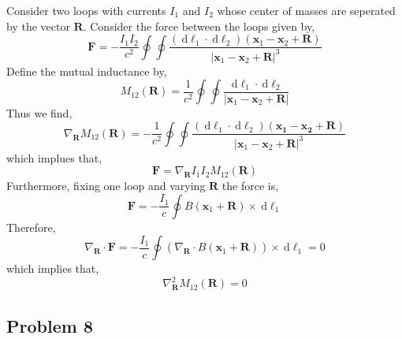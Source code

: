 \documentclass[12pt]{extarticle}
\renewcommand{\d}[1]{\: \mathrm{d}#1}
\renewcommand{\bf}[1]{\mathbf{#1}}
\theoremstyle{definition}
\begin{document}
Consider two loops with currents $I_1$ and $I_2$ whose center of masses are seperated by the vector $\bf{R}$. Consider the force between the loops given by,
\[ \bf{F} = - \frac{I_1 I_2}{c^2} \oint \oint \frac{(\d{\ell_1} \cdot \d{\ell_2}) (\bf{x}_1 - \bf{x}_2 + \bf{R})}{| \bf{x}_1 - \bf{x}_2 + \bf{R} |^3} \]
Define the mutual inductance by,
\[ M_{12}(\bf{R}) = \frac{1}{c^2} \oint \oint \frac{\d{\ell_1} \cdot \d{\ell_2}}{| \bf{x}_1 - \bf{x}_2 + \bf{R} |} \]
Thus we find,
\[ \nabla_{\bf{R}} M_{12}(\bf{R}) = - \frac{1}{c^2} \oint \oint \frac{(\d{\ell_1} \cdot \d{\ell_2}) (\bf{x_1} - \bf{x_2} + \bf{R}) }{| \bf{x}_1 - \bf{x}_2 + \bf{R} |^3} \]
which implues that,
\[ \bf{F} = \nabla_{\bf{R}} I_1 I_2 M_{12}(\bf{R}) \]
Furthermore, fixing one loop and varying $\bf{R}$ the force is,
\[ \bf{F} = -\frac{I_1}{c} \oint B(\bf{x}_1 + \bf{R}) \times \d{\ell_1} \]
Therefore,
\[ \nabla_{\bf{R}} \cdot \bf{F} = - \frac{I_1}{c} \oint (\nabla_{\bf{R}} \cdot B(\bf{x}_1 + \bf{R})) \times \d{\ell_1} = 0 \]
which implies that,
\[ \nabla_{\bf{R}}^2 M_{12}(\bf{R}) = 0 \]

\subsection{Problem 8}
\end{document}
